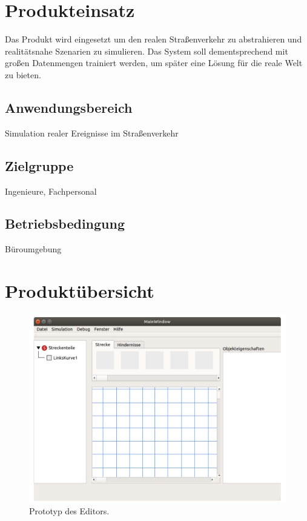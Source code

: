 \documentclass[11pt,a4paper]{article}
\begin{document}
	\pagebreak
	\section{Produkteinsatz}
	Das Produkt wird eingesetzt um den realen Straßenverkehr zu abstrahieren und realitätsnahe Szenarien zu simulieren. Das System soll dementsprechend mit großen Datenmengen trainiert werden, um später eine Lösung für die reale Welt zu bieten.
	
	\subsection{Anwendungsbereich}
	Simulation realer Ereignisse im Straßenverkehr
	\subsection{Zielgruppe}
	Ingenieure, Fachpersonal
	\subsection{Betriebsbedingung}
	Büroumgebung
	
	\pagebreak
	\section{Produktübersicht}
	\begin{figure}[ht]
		\centering
		\includegraphics[width=\textwidth]{prototyp1}
		\caption[Netztopologie elektrische Versorgung]{Prototyp des Editors.}
		\label{fig:prot1}
	\end{figure}
\end{document}

